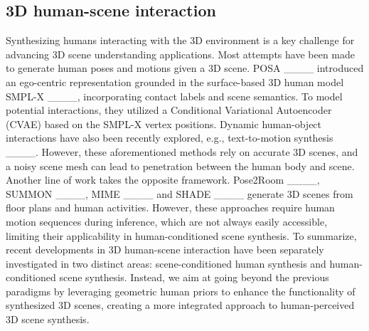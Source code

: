 \subsection{3D human-scene interaction} 
Synthesizing humans interacting with the 3D environment is a key challenge for advancing 3D scene understanding applications. Most attempts have been made to generate human poses and motions given a 3D scene. POSA ____ introduced an ego-centric representation grounded in the surface-based 3D human model SMPL-X ____, incorporating contact labels and scene semantics. To model potential interactions, they utilized a Conditional Variational Autoencoder (CVAE) based on the SMPL-X vertex positions. 
Dynamic human-object interactions have also been recently explored, e.g., text-to-motion synthesis ____. However, these aforementioned methods rely on accurate 3D scenes, and a noisy scene mesh can lead to penetration between the human body and scene. Another line of work takes the opposite framework. Pose2Room ____, SUMMON ____, MIME ____ and SHADE ____ generate 3D scenes from floor plans and human activities. However, these approaches require human motion sequences during inference, which are not always easily accessible, limiting their applicability in human-conditioned scene synthesis. To summarize, recent developments in 3D human-scene interaction have been separately investigated in two distinct areas: scene-conditioned human synthesis and human-conditioned scene synthesis. Instead, we aim at going beyond the previous paradigms by leveraging geometric human priors to enhance the functionality of synthesized 3D scenes, creating a more integrated approach to human-perceived 3D scene synthesis.
